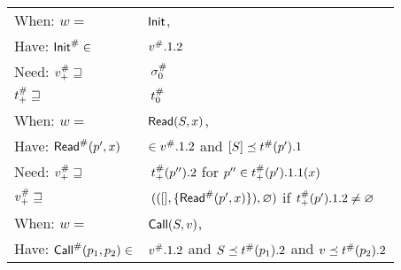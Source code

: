 \begin{center}
  \begin{tabular}{|l@{\hskip2pt}l|}
    \hline
    When: \hfill $w=$                                & $\mathsf{Init}$,                                                                                                                                               \\
    Have: \hfill ${\mathsf{Init}}^{\#}\in$                     & ${v}^{\#}.1.2$                                                                                                                                           \\
    Need: \hfill ${v}^{\#}_+\sqsupseteq$              & $\:{\sigma}^{\#}_0$                                                                                                                                          \\
    \hfill ${t}^{\#}_+\sqsupseteq$                 & $\:{t}^{\#}_0$                                                                                                                                        \\
    \hline
    When: \hfill $w=$                                & $\mathsf{Read}(S,x)$,                                                                                                                                     \\
    Have: \hfill ${\mathsf{Read}}^{\#}(p',x)$                  & $\in{v}^{\#}.1.2$ and $[S]\preceq{t}^{\#}(p').1$                                                                                                  \\
    Need: \hfill ${v}^{\#}_+\sqsupseteq$              & $\:{t}^{\#}_+(p'').2$                                                             \hfill for $p''\in{t}^{\#}_+(p').1.1(x)$                          \\
    \hfill ${v}^{\#}_+\sqsupseteq$                    & $\:(([],\{{\mathsf{Read}}^{\#}(p',x)\}),\varnothing)$                                         \hfill if ${t}^{\#}_+(p').1.2\neq\varnothing$                     \\
    \hline
    When: \hfill $w=$                                & $\mathsf{Call}(S,v)$,                                                                                                                                     \\
    Have: \hfill ${\mathsf{Call}}^{\#}(p_1,p_2)\in$            & ${v}^{\#}.1.2$ and $S\preceq{t}^{\#}(p_1).2$ and $v\preceq{t}^{\#}(p_2).2$                                                                      \\

\end{tabular}
\end{center}
